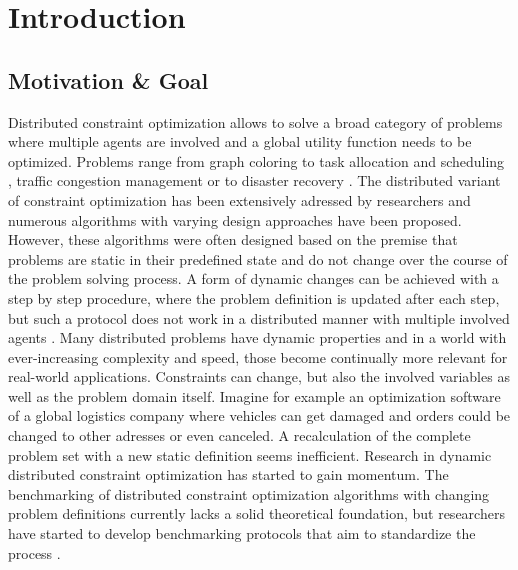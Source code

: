 \chapter{Introduction}

\section{Motivation \& Goal}
Distributed constraint optimization allows to solve a broad category of problems where multiple agents are involved and a global utility function needs to be optimized. Problems range from graph coloring \cite{Modi2005} to task allocation and scheduling \cite{Zhang}, traffic congestion management \cite{Leeuwen2002} or to disaster recovery \cite{J1999}. The distributed variant of constraint optimization has been extensively adressed by researchers and numerous algorithms with varying design approaches have been proposed. However, these algorithms were often designed based on the premise that problems are static in their predefined state and do not change over the course of the problem solving process. A form of dynamic changes can be achieved with a step by step procedure, where the problem definition is updated after each step, but such a protocol does not work in a distributed manner with multiple involved agents \cite{Petcua}. Many distributed problems have dynamic properties and in a world with ever-increasing complexity and speed, those become continually more relevant for real-world applications. Constraints can change, but also the involved variables as well as the problem domain itself. Imagine for example an optimization software of a global logistics company where vehicles can get damaged and orders could be changed to other adresses or even canceled. A recalculation of the complete problem set with a new  static definition seems inefficient. Research in dynamic distributed constraint optimization has started to gain momentum. The benchmarking of distributed constraint optimization  algorithms with changing problem definitions currently lacks a solid theoretical foundation, but researchers have started to develop benchmarking protocols that aim to standardize the process \cite{Maillera}. 
\newline \newline
